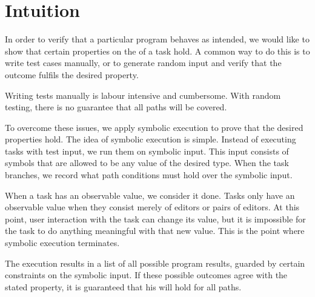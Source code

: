 


\section{Intuition}
\label{sec:intuition}

In order to verify that a particular \TOPHAT program behaves as intended,
we would like to show that certain properties on the of a task hold.
A common way to do this is to write test cases manually,
or to generate random input and verify that the outcome fulfils the desired property.

Writing tests manually is labour intensive and cumbersome.
With random testing, there is no guarantee that all paths will be covered.

To overcome these issues, we apply symbolic execution to prove that the desired properties hold.
The idea of symbolic execution is simple.
Instead of executing tasks with test input, we run them on symbolic input.
This input consists of symbols that are allowed to be any value of the desired type.
When the task branches, we record what path conditions must hold over the symbolic input.

When a task has an observable value, we consider it done.
Tasks only have an observable value when they consist merely of editors or pairs of editors.
At this point, user interaction with the task can change its value, but it is impossible for the task to do anything meaningful with that new value.
This is the point where symbolic execution terminates.

The execution results in a list of all possible program results,
guarded by certain constraints on the symbolic input.
If these possible outcomes agree with the stated property,
it is guaranteed that his will hold for all paths.

